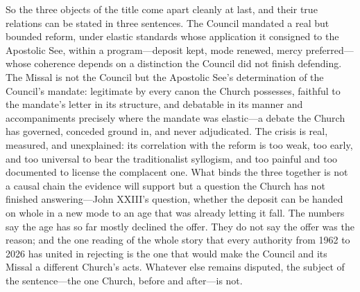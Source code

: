 So the three objects of the title come apart cleanly at last, and their true relations can be stated in three sentences. The Council mandated a real but bounded reform, under elastic standards whose application it consigned to the Apostolic See, within a program---deposit kept, mode renewed, mercy preferred---whose coherence depends on a distinction the Council did not finish defending. The Missal is not the Council but the Apostolic See's determination of the Council's mandate: legitimate by every canon the Church possesses, faithful to the mandate's letter in its structure, and debatable in its manner and accompaniments precisely where the mandate was elastic---a debate the Church has governed, conceded ground in, and never adjudicated. The crisis is real, measured, and unexplained: its correlation with the reform is too weak, too early, and too universal to bear the traditionalist syllogism, and too painful and too documented to license the complacent one. What binds the three together is not a causal chain the evidence will support but a question the Church has not finished answering---John XXIII's question, whether the deposit can be handed on whole in a new mode to an age that was already letting it fall. The numbers say the age has so far mostly declined the offer. They do not say the offer was the reason; and the one reading of the whole story that every authority from 1962 to 2026 has united in rejecting is the one that would make the Council and its Missal a different Church's acts. Whatever else remains disputed, the subject of the sentence---the one Church, before and after---is not.
